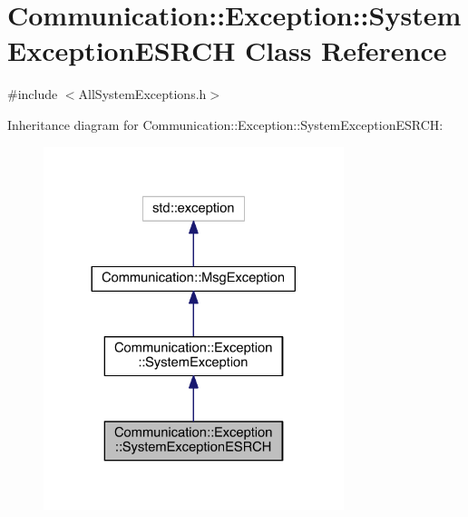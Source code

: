 \hypertarget{class_communication_1_1_exception_1_1_system_exception_e_s_r_c_h}{}\section{Communication\+:\+:Exception\+:\+:System\+Exception\+E\+S\+R\+C\+H Class Reference}
\label{class_communication_1_1_exception_1_1_system_exception_e_s_r_c_h}


{\ttfamily \#include $<$All\+System\+Exceptions.\+h$>$}



Inheritance diagram for Communication\+:\+:Exception\+:\+:System\+Exception\+E\+S\+R\+C\+H\+:\nopagebreak
\begin{figure}[H]
\begin{center}
\leavevmode
\includegraphics[width=248pt]{class_communication_1_1_exception_1_1_system_exception_e_s_r_c_h__inherit__graph}
\end{center}
\end{figure}


